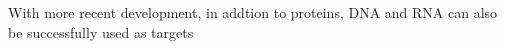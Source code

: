 With more recent development, in addtion to proteins, DNA and RNA can also be successfully used as targets
